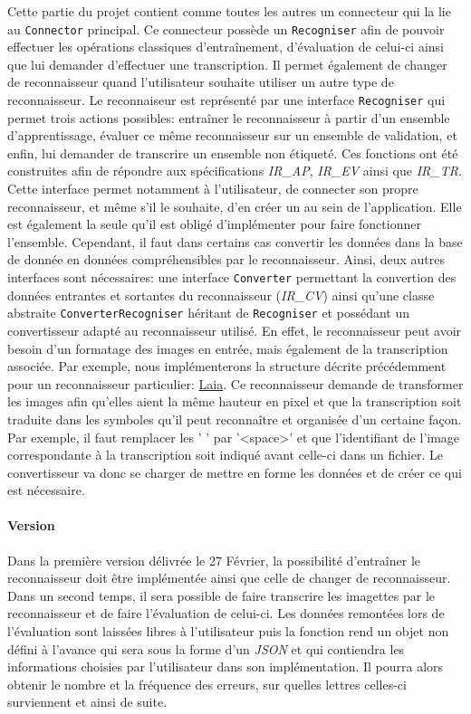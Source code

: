 Cette partie du projet contient comme toutes les autres un connecteur qui la lie au \texttt{Connector} principal. Ce connecteur possède un \texttt{Recogniser} afin de pouvoir effectuer les opérations classiques d'entraînement, d'évaluation de celui-ci ainsi que lui demander d'effectuer une transcription. Il permet également de changer de reconnaisseur quand l'utilisateur souhaite utiliser un autre type de reconnaisseur.
\newline{}
Le reconnaiseur est représenté par une interface \texttt{Recogniser} qui permet trois actions possibles: entraîner le reconnaisseur à partir d'un ensemble d'apprentissage, évaluer ce même reconnaisseur sur un ensemble de validation, et enfin, lui demander de transcrire un ensemble non étiqueté. Ces fonctions ont été construites afin de répondre aux spécifications \textit{IR\_AP}, \textit{IR\_EV} ainsi que \textit{IR\_TR}.
Cette interface permet notamment à l'utilisateur, de connecter son propre reconnaisseur, et même s'il le souhaite, d'en créer un au sein de l'application. Elle est également la seule qu'il est obligé d'implémenter pour faire fonctionner l'ensemble. Cependant, il faut dans certains cas convertir les données dans la base de donnée en données compréhensibles par le reconnaisseur. Ainsi, deux autres interfaces sont nécessaires: une interface \texttt{Converter} permettant la convertion des données entrantes et sortantes du reconnaisseur (\textit{IR\_CV}) ainsi qu'une classe abstraite \texttt{ConverterRecogniser} héritant de \texttt{Recogniser} et possédant un convertisseur adapté au reconnaisseur utilisé. En effet, le reconnaisseur peut avoir besoin d'un formatage des images en entrée, mais également de la transcription associée. Par exemple, nous implémenterons la structure décrite précédemment pour un reconnaisseur particulier: \href{https://github.com/jpuigcerver/Laia}{Laia}. Ce reconnaisseur demande de transformer les images afin qu'elles aient la même hauteur en pixel et que la transcription soit traduite dans les symboles qu'il peut reconnaître et organisée d'un certaine façon. Par exemple, il faut remplacer les  ' ' par '<space>' et que l'identifiant de l'image correspondante à la transcription soit indiqué avant celle-ci dans un fichier. Le convertisseur va donc se charger de mettre en forme les données et de créer ce qui est nécessaire.
\paragraph{Version}
Dans la première version délivrée le 27 Février, la possibilité d'entraîner le reconnaisseur doit être implémentée ainsi que celle de changer de reconnaisseur. Dans un second temps, il sera possible de faire transcrire les imagettes par le reconnaisseur et de faire l'évaluation de celui-ci. Les données remontées lors de l'évaluation sont laissées libres à l'utilisateur puis la fonction rend un objet non défini à l'avance qui sera sous la forme d'un \textit{JSON} et qui contiendra les informations choisies par l'utilisateur dans son implémentation. Il pourra alors obtenir le nombre et la fréquence des erreurs, sur quelles lettres celles-ci surviennent et ainsi de suite.

